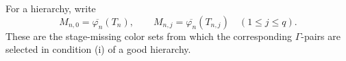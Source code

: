 \begin{definition}
For a hierarchy, write
\[
 M_{n,0}=\overline{\varphi_n}(T_n),\qquad
 M_{n,j}=\overline{\varphi_n}(T_{n,j})\quad(1\leq j\leq q).
\]
These are the stage-missing color sets from which the corresponding
$\Gamma$-pairs are selected in condition (i) of a good hierarchy.
\end{definition}
